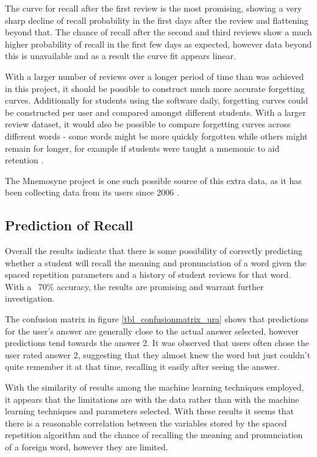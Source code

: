 The curve for recall after the first review is the most promising, showing a very
sharp decline of recall probability in the first days after the review and flattening
beyond that. The chance of recall after the second and third reviews show a much 
higher probability of recall in the first few days as expected, however data
beyond this is unavailable and as a result the curve fit appears linear.

With a larger number of reviews over a longer period of time than was achieved in this project,
it should be possible to construct much more accurate forgetting curves. Additionally for
students using the software daily, forgetting curves could be constructed per user and
compared amongst different students. With a larger review dataset, it would also be
possible to compare forgetting curves across different words - some words might be more
quickly forgotten while others might remain for longer, for example if students were
taught a mnemonic to aid retention \cite{mnemonics_1992}.

The Mnemosyne project is one such possible source of this extra data, as it has
been collecting data from its users since 2006 \cite{peter_bienstman_principles_2012}.



\subsection{Prediction of Recall}
Overall the results indicate that there is some possibility of
correctly predicting whether
a student will recall the meaning and pronunciation of a word given the spaced
repetition parameters and a history of
student reviews for that word. With a ~70\% accuracy, the results are
promising and warrant further investigation.

The confusion matrix in figure \ref{tbl_confusionmatrix_ura} shows that predictions
for the user's answer are generally close to the actual answer selected, however
predictions tend towards the answer 2. It was observed that users often chose the
user rated answer 2, suggesting that they almost knew the word but just couldn't quite remember it at
that time, recalling it easily after seeing the answer.

With the similarity of results among the machine learning techniques employed, it
appears that the limitations are with the data rather than with the machine learning
techniques and parameters selected. With these results it seems that there is a
reasonable correlation
between the variables stored by the spaced repetition algorithm and the chance of
recalling the meaning and pronunciation of a foreign word, however they are limited.

